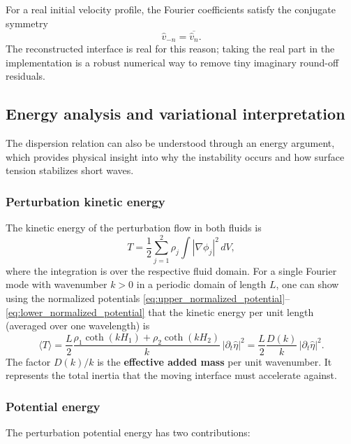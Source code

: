 \documentclass[11pt,a4paper]{article}
\begin{document}
For a real initial velocity profile, the Fourier coefficients satisfy the conjugate symmetry
\begin{equation}
    \widehat{v}_{-n}=\overline{\widehat{v}_n}.
\end{equation}
The reconstructed interface is real for this reason; taking the real part in the implementation is a robust numerical way to remove tiny imaginary round-off residuals.

\subsection{Energy analysis and variational interpretation}

The dispersion relation can also be understood through an energy argument, which provides physical insight into why the instability occurs and how surface tension stabilizes short waves.

\subsubsection{Perturbation kinetic energy}

The kinetic energy of the perturbation flow in both fluids is
\begin{equation}
    T
    =
    \frac{1}{2}\sum_{j=1}^{2}\rho_j\int |\nabla\phi_j|^2\,dV,
    \label{eq:kinetic_energy}
\end{equation}
where the integration is over the respective fluid domain.  For a single Fourier mode with wavenumber $k>0$ in a periodic domain of length $L$, one can show using the normalized potentials \eqref{eq:upper_normalized_potential}--\eqref{eq:lower_normalized_potential} that the kinetic energy per unit length (averaged over one wavelength) is
\begin{equation}
    \langle T \rangle
    =
    \frac{L}{2}
    \frac{\rho_1\coth(kH_1)+\rho_2\coth(kH_2)}{k}\,
    |\partial_t\widehat{\eta}|^2
    =
    \frac{L}{2}\frac{D(k)}{k}\,|\partial_t\widehat{\eta}|^2.
    \label{eq:modal_kinetic_energy}
\end{equation}
The factor $D(k)/k$ is the \textbf{effective added mass} per unit wavenumber.  It represents the total inertia that the moving interface must accelerate against.

\subsubsection{Potential energy}

The perturbation potential energy has two contributions:
\end{document}
